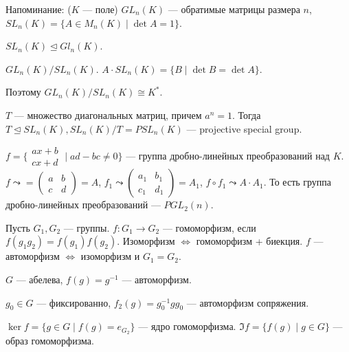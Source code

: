 Напоминание: ($K$ --- поле) $GL_n(K)$ --- обратимые матрицы размера  $n$,  $SL_n(K) = \{ A \in M_n(K) \mid \det A = 1\}$.

\begin{statement}
    $SL_n(K) \trianglelefteq Gl_n(K)$.

     $GL_n(K) / SL_n(K)$.  $A \cdot SL_n(K) = \{B \mid \det B = \det A \}$.

     Поэтому  $GL_n(K) / SL_n(K) \cong K^*$.
\end{statement}

\begin{statement}
    $T$ --- множество диагональных матриц, причем  $a^n = 1$. Тогда  $T \trianglelefteq SL_n(K), SL_n(K) / T = PSL_n(K)$ --- projective special group.
\end{statement}
\begin{example}
    $f = \{ \begin{array}{l} ax + b \\ cx + d \end{array} \mid ad - bc \neq 0 \}$ --- группа дробно-линейных преобразований над $K$. $f \leadsto = \begin{pmatrix} a & b \\ c & d \end{pmatrix} = A$,  $f_1 \leadsto \begin{pmatrix} a_1 & b_1 \\ c_1 & d_1 \end{pmatrix} = A_1$, $f \circ f_1 \leadsto A \cdot A_1$. То есть группа дробно-линейных преобразований ---   $PGL_2(n)$.
\end{example}
Пусть $G_1, G_2$ --- группы. $f\!: G_1 \to G_2$ --- гомоморфизм, если $f(g_1g_2) = f(g_1)f(g_2)$. Изоморфизм $\iff$ гомоморфизм + биекция.  $f$ --- автоморфизм  $\iff$ изоморфизм и  $G_1 = G_2$.
\begin{remark}
    $G$ --- абелева,  $f(g) = g^{-1}$ --- автоморфизм.

     $g_0 \in G$ --- фиксированно, $f_2(g) = g_0^{-1}gg_0$ --- автоморфизм сопряжения.
\end{remark}

$\ker f = \{g \in G \mid f(g) = e_{G_2}\}$ --- ядро гомоморфизма.  $\Im f = \{ f(g) \mid g \in G \}$ --- образ гомоморфизма.

